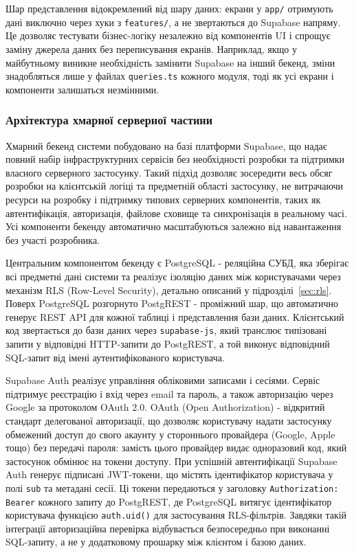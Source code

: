 Шар представлення відокремлений від шару даних: екрани у \texttt{app/} отримують дані виключно через хуки з \texttt{features/}, а не звертаються до Supabase напряму. Це дозволяє тестувати бізнес-логіку незалежно від компонентів \gls{UI} і спрощує заміну джерела даних без переписування екранів. Наприклад, якщо у майбутньому виникне необхідність замінити Supabase на інший бекенд, зміни знадобляться лише у файлах \texttt{queries.ts} кожного модуля, тоді як усі екрани і компоненти залишаться незмінними.

\subsubsection{Архітектура хмарної серверної частини}

Хмарний бекенд системи побудовано на базі платформи Supabase, що надає повний набір інфраструктурних сервісів без необхідності розробки та підтримки власного серверного застосунку. Такий підхід дозволяє зосередити весь обсяг розробки на клієнтській логіці та предметній області застосунку, не витрачаючи ресурси на розробку і підтримку типових серверних компонентів, таких як автентифікація, авторизація, файлове сховище та синхронізація в реальному часі. Усі компоненти бекенду автоматично масштабуються залежно від навантаження без участі розробника.

Центральним компонентом бекенду є PostgreSQL - реляційна \gls{СУБД}, яка зберігає всі предметні дані системи та реалізує ізоляцію даних між користувачами через механізм \gls{RLS} (Row-Level Security), детально описаний у підрозділі~\ref{sec:rls}. Поверх PostgreSQL розгорнуто PostgREST - проміжний шар, що автоматично генерує \gls{REST} \gls{API} для кожної таблиці і представлення бази даних. Клієнтський код звертається до бази даних через \texttt{supabase-js}, який транслює типізовані запити у відповідні HTTP-запити до PostgREST, а той виконує відповідний \gls{SQL}-запит від імені аутентифікованого користувача.

Supabase Auth реалізує управління обліковими записами і сесіями. Сервіс підтримує реєстрацію і вхід через email та пароль, а також авторизацію через Google за протоколом \gls{OAuth} 2.0. \gls{OAuth} (Open Authorization) - відкритий стандарт делегованої авторизації, що дозволяє користувачу надати застосунку обмежений доступ до свого акаунту у стороннього провайдера (Google, Apple тощо) без передачі пароля: замість цього провайдер видає одноразовий код, який застосунок обмінює на токени доступу. При успішній автентифікації Supabase Auth генерує підписані \gls{JWT}-токени, що містять ідентифікатор користувача у полі \texttt{sub} та метадані сесії. Ці токени передаються у заголовку \texttt{Authorization: Bearer} кожного запиту до PostgREST, де PostgreSQL витягує ідентифікатор користувача функцією \texttt{auth.uid()} для застосування \gls{RLS}-фільтрів. Завдяки такій інтеграції авторизаційна перевірка відбувається безпосередньо при виконанні \gls{SQL}-запиту, а не у додатковому прошарку між клієнтом і базою даних.

